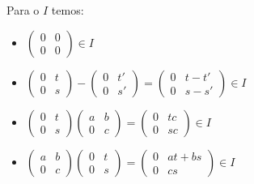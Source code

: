 \documentclass[10pt,a4paper]{article}
\begin{document}
\noindent
Para o $I$ temos:
\begin{itemize}
\item $\begin{pmatrix}
0&0\\0&0
\end{pmatrix}\in I$
\item $\begin{pmatrix}
0&t\\0&s
\end{pmatrix}-\begin{pmatrix}
0&t'\\0&s'
\end{pmatrix}=\begin{pmatrix}
0&t-t'\\0&s-s'
\end{pmatrix}\in I$
\item $\begin{pmatrix}
0&t\\0&s
\end{pmatrix}\begin{pmatrix}
a&b\\0&c
\end{pmatrix}=\begin{pmatrix}
0&tc\\0&sc
\end{pmatrix}\in I$
\item $\begin{pmatrix}
a&b\\0&c
\end{pmatrix}\begin{pmatrix}
0&t\\0&s
\end{pmatrix}=\begin{pmatrix}
0&at+bs\\0&cs
\end{pmatrix}\in I$
\end{itemize}
\end{document}
